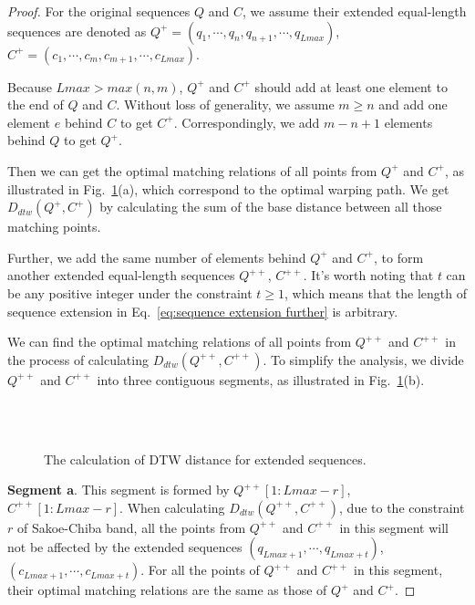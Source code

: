 \documentclass[10pt,journal,compsoc]{IEEEtran}
\begin{document}
\begin{proof}
For the original sequences $Q$ and $C$,
we assume their extended equal-length sequences are denoted as
$Q^+=(q_1, \cdots, q_n, q_{n+1},\cdots,q_{Lmax})$,
$C^+=(c_1, \cdots, c_m, c_{m+1}, \cdots,c_{Lmax})$.


Because $Lmax>max(n,m)$,
$Q^+$ and $C^+$ should add at least one element to the end of $Q$ and $C$.
Without loss of generality, we assume $m \geq n$
and add one element $e$ behind $C$ to get $C^+$.
Correspondingly, we add $m-n+1$ elements behind $Q$ to get $Q^+$.

Then we can get the optimal matching relations of all points from $Q^+$ and $C^+$,
as illustrated in Fig.~\ref{fig:extended proof}(a),
which correspond to the optimal warping path.
We get $D_{dtw}(Q^+,C^+)$ by calculating the sum of the base distance between all those matching points.

Further, we add the same number of elements behind $Q^+$ and $C^+$,
to form another extended equal-length sequences $Q^{++}$, $C^{++}$.
It's worth noting that $t$ can be any positive integer under the constraint $t\geq 1$,
which means that the length of sequence extension in Eq.~\eqref{eq:sequence extension further} is arbitrary.

We can find the optimal matching relations of all points from $Q^{++}$ and $C^{++}$
in the process of calculating $D_{dtw}(Q^{++},C^{++})$.
To simplify the analysis,
we divide $Q^{++}$ and $C^{++}$ into three contiguous segments,
as illustrated in Fig.~\ref{fig:extended proof}(b).

\begin{figure}[!htbp]
\centering
{}\\
\\
\caption{The calculation of DTW distance for extended sequences.}
\label{fig:extended proof}
\end{figure}


\textbf{Segment a}.
This segment is formed by $Q^{++}[1:Lmax-r]$, $C^{++}[1:Lmax-r]$.
When calculating $D_{dtw}(Q^{++},C^{++})$,
due to the constraint $r$ of Sakoe-Chiba band,
all the points from $Q^{++}$ and $C^{++}$ in this segment will not be affected by the extended sequences
$(q_{Lmax+1}, \cdots,q_{Lmax+t})$, $(c_{Lmax+1}, \cdots,c_{Lmax+t})$.
For all the points of $Q^{++}$ and $C^{++}$ in this segment,
their optimal matching relations are the same as those of $Q^+$ and $C^+$.


\end{proof}
\end{document}
